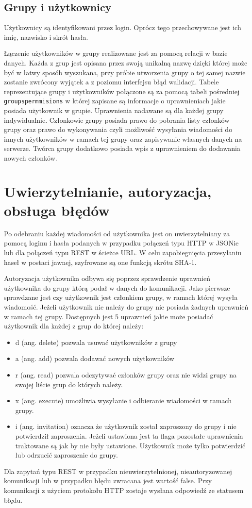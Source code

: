 \documentclass[11pt,a4paper,polish,thesis]{dcsbook}
\begin{document}
\subsection{Grupy i użytkownicy}

Użytkownicy są identyfikowani przez login. Oprócz tego przechowywane jest ich imię, nazwisko i skrót hasła.

Łączenie użytkowników w grupy realizowane jest za pomocą relacji w bazie danych. 
Każda z grup jest opisana przez swoją unikalną nazwę dzięki której może być w łatwy sposób wyszukana, przy próbie utworzenia grupy o tej samej nazwie zostanie zwrócony wyjątek a z poziomu interfejsu błąd walidacji.
Tabele reprezentujące grupy i użytkowników połączone są za pomocą tabeli pośredniej \texttt{groupspermmisions} w której zapisane są informacje o uprawnieniach jakie posiada użytkownik w grupie. 
Uprawnienia nadawane są dla każdej grupy indywidualnie. 
Członkowie grupy posiada prawo do pobrania listy członków grupy oraz prawo do wykonywania czyli możliwość wysyłania wiadomości do innych użytkowników w ramach tej grupy oraz zapisywanie własnych danych na serwerze.
Twórca grupy dodatkowo posiada wpis z uprawnieniem do dodawania nowych członków. 

\section{Uwierzytelnianie, autoryzacja, obsługa błędów} 
Po odebraniu każdej wiadomości od użytkownika jest on uwierzytelniany za pomocą loginu i hasła podanych w przypadku połączeń typu HTTP w JSONie lub dla połączeń typu REST w ścieżce URL.
W celu zapobiegnięcia przesyłaniu haseł w postaci jawnej, szyfrowane są one funkcją skrótu SHA-1.

Autoryzacja użytkownika odbywa się poprzez sprawdzenie uprawnień użytkownika do grupy którą podał w danych do komunikacji. 
Jako pierwsze sprawdzane jest czy użytkownik jest członkiem grupy, w ramach której wysyła wiadomość. 
Jeżeli użytkownik nie należy do grupy nie posiada żadnych uprawnień w ramach tej grupy.
Dostępnych jest 5 uprawnień jakie może posiadać użytkownik dla każdej z grup do której należy:
\begin{itemize}
\item d (ang. delete) pozwala usuwać użytkowników z grupy
\item a (ang. add) pozwala dodawać nowych użytkowników
\item r (ang. read) pozwala odczytywać członków grupy oraz nie widzi grupy na swojej liście grup do których należy.
\item x (ang. execute) umożliwia wysyłanie i odbieranie wiadomości w ramach grupy.
\item i (ang. invitation) oznacza że użytkownik został zaproszony do grupy i nie potwierdził zaproszenia. Jeżeli ustawiona jest ta flaga pozostałe uprawnienia traktowane są jak by nie były ustawione. Użytkownik może tylko potwierdzić lub odrzucić zaproszenie do grupy.
\end{itemize}
Dla zapytań typu REST w przypadku nieuwierzytelnionej, nieautoryzowanej komunikacji lub w przypadku błędu zwracana jest wartość false.
Przy komunikacji z użyciem protokołu HTTP zostaje wysłana odpowiedź ze statusem błędu.
\end{document}
